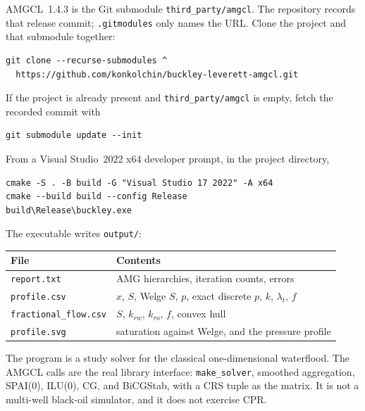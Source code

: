 \documentclass[11pt]{article}
\begin{document}
AMGCL~1.4.3 is the Git submodule \texttt{third\_party/amgcl}. The repository records that release commit; \texttt{.gitmodules} only names the URL.
Clone the project and that submodule together:
\begin{lstlisting}
git clone --recurse-submodules ^
  https://github.com/konkolchin/buckley-leverett-amgcl.git
\end{lstlisting}
If the project is already present and \texttt{third\_party/amgcl} is empty, fetch the recorded commit with
\begin{lstlisting}
git submodule update --init
\end{lstlisting}
From a Visual Studio~2022 x64 developer prompt, in the project directory,
\begin{lstlisting}
cmake -S . -B build -G "Visual Studio 17 2022" -A x64
cmake --build build --config Release
build\Release\buckley.exe
\end{lstlisting}
The executable writes \texttt{output/}:
\begin{center}
\begin{tabular}{@{}ll@{}}
\toprule
File & Contents \\
\midrule
\texttt{report.txt} & AMG hierarchies, iteration counts, errors \\
\texttt{profile.csv} & $x$, $S$, Welge $S$, $p$, exact discrete $p$, $k$, $\lambda_t$, $f$ \\
\texttt{fractional\_flow.csv} & $S$, $k_{rw}$, $k_{ro}$, $f$, convex hull \\
\texttt{profile.svg} & saturation against Welge, and the pressure profile \\
\bottomrule
\end{tabular}
\end{center}

The program is a study solver for the classical one-dimensional waterflood.
The AMGCL calls are the real library interface: \texttt{make\_solver}, smoothed aggregation, SPAI(0), ILU(0), CG, and BiCGStab, with a CRS tuple as the matrix.
It is not a multi-well black-oil simulator, and it does not exercise CPR.
\end{document}
